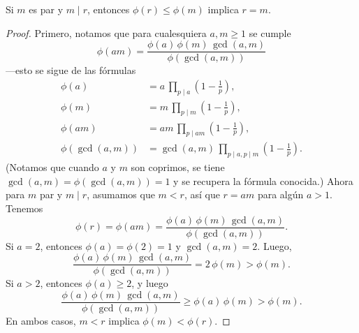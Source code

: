 \begin{lema}
  \label{lema:phi-de-Euler}
  Si $m$ es par y $m\mid r$, entonces $\phi (r) \le \phi (m)$ implica $r = m$.

  \begin{proof}
    Primero, notamos que para cualesquiera $a,m \ge 1$ se cumple
    $$\phi (am) = \frac{\phi (a)\,\phi (m)\,\gcd (a,m)}{\phi (\gcd (a,m))}$$
    ---esto se sigue de las fórmulas
    \begin{align*}
      \phi (a) & = a\,\prod_{p\mid a} \left(1 - \frac{1}{p}\right),\\
      \phi (m) & = m\,\prod_{p\mid m} \left(1 - \frac{1}{p}\right),\\
      \phi (am) & = am\,\prod_{p\mid am} \left(1 - \frac{1}{p}\right),\\
      \phi (\gcd (a,m)) & = \gcd (a,m)\,\prod_{p \mid a, p \mid m} \left(1 - \frac{1}{p}\right).
    \end{align*}
    (Notamos que cuando $a$ y $m$ son coprimos, se tiene
    $\gcd (a,m) = \phi (\gcd (a,m)) = 1$ y se recupera la fórmula conocida.)
    Ahora para $m$ par y $m\mid r$, asumamos que $m < r$, así que $r = am$ para
    algún $a > 1$. Tenemos
    \[ \phi (r) = \phi (am) =
       \frac{\phi (a)\,\phi(m)\,\gcd (a,m)}{\phi (\gcd (a,m))}. \]
    Si $a = 2$, entonces $\phi (a) = \phi (2) = 1$ y $\gcd (a,m) = 2$. Luego,
    \[ \frac{\phi (a)\,\phi(m)\,\gcd (a,m)}{\phi (\gcd (a,m))} =
       2\,\phi(m) > \phi (m). \]
    Si $a > 2$, entonces $\phi (a) \ge 2$, y luego
    \[ \frac{\phi (a)\,\phi(m)\,\gcd (a,m)}{\phi (\gcd (a,m))} \ge
       \phi (a)\,\phi(m) > \phi (m). \]
    En ambos casos, $m < r$ implica $\phi (m) < \phi (r)$.
  \end{proof}
\end{lema}

